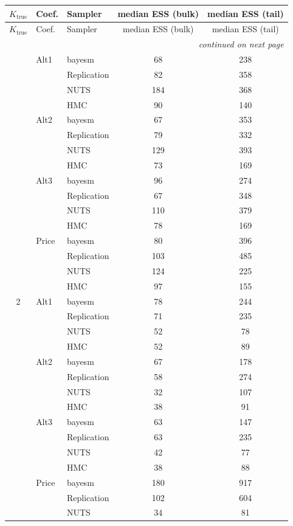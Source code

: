 \begin{longtable}{cllcc}
\toprule
$K_{\text{true}}$ & Coef. & Sampler & median ESS (bulk) & median ESS (tail) \\
\midrule
\endfirsthead
\toprule
$K_{\text{true}}$ & Coef. & Sampler & median ESS (bulk) & median ESS (tail) \\
\midrule
\endhead
\midrule
\multicolumn{5}{r}{\emph{continued on next page}} \\
\endfoot
\bottomrule
\endlastfoot
1 & Alt1 & bayesm & 68 & 238 \\
 &  & Replication & 82 & 358 \\
 &  & NUTS & 184 & 368 \\
 &  & HMC & 90 & 140 \\
 & Alt2 & bayesm & 67 & 353 \\
 &  & Replication & 79 & 332 \\
 &  & NUTS & 129 & 393 \\
 &  & HMC & 73 & 169 \\
 & Alt3 & bayesm & 96 & 274 \\
 &  & Replication & 67 & 348 \\
 &  & NUTS & 110 & 379 \\
 &  & HMC & 78 & 169 \\
 & Price & bayesm & 80 & 396 \\
 &  & Replication & 103 & 485 \\
 &  & NUTS & 124 & 225 \\
 &  & HMC & 97 & 155 \\
2 & Alt1 & bayesm & 78 & 244 \\
 &  & Replication & 71 & 235 \\
 &  & NUTS & 52 & 78 \\
 &  & HMC & 52 & 89 \\
 & Alt2 & bayesm & 67 & 178 \\
 &  & Replication & 58 & 274 \\
 &  & NUTS & 32 & 107 \\
 &  & HMC & 38 & 91 \\
 & Alt3 & bayesm & 63 & 147 \\
 &  & Replication & 63 & 235 \\
 &  & NUTS & 42 & 77 \\
 &  & HMC & 38 & 88 \\
 & Price & bayesm & 180 & 917 \\
 &  & Replication & 102 & 604 \\
 &  & NUTS & 34 & 81 \\

\end{longtable}
